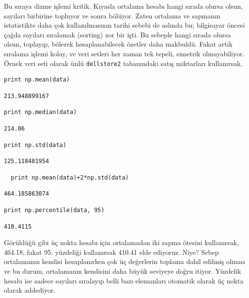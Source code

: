 \documentclass[12pt,fleqn]{article}\usepackage{../../common}
\begin{document}
Bu sıraya dizme işlemi kritik. Kıyasla ortalama hesabı hangi sırada olursa
olsun, sayıları birbirine topluyor ve sonra bölüyor. Zaten ortalama ve
sapmanın istatistikte daha çok kullanılmasının tarihi sebebi de aslında bu;
bilgisayar öncesi çağda sayıları sıralamak (sorting) zor bir işti. Bu
sebeple hangi sırada olursa olsun, toplayıp, bölerek hesaplanabilecek
özetler daha makbuldü. Fakat artık sıralama işlemi kolay, ve veri setleri
her zaman tek tepeli, simetrik olmayabiliyor. Örnek veri seti olarak ünlü
\verb!dellstore2! tabanındaki satış miktarları kullanırsak,

\begin{verbatim}
print np.mean(data)
\end{verbatim}

\begin{verbatim}
213.948899167
\end{verbatim}

\begin{verbatim}
print np.median(data)
\end{verbatim}

\begin{verbatim}
214.06
\end{verbatim}

\begin{verbatim}
print np.std(data)
\end{verbatim}

\begin{verbatim}
125.118481954
\end{verbatim}

\begin{verbatim}
  print np.mean(data)+2*np.std(data)
\end{verbatim}

\begin{verbatim}
464.185863074
\end{verbatim}

\begin{verbatim}
print np.percentile(data, 95)
\end{verbatim}

\begin{verbatim}
410.4115
\end{verbatim}

Görüldüğü gibi üç nokta hesabı için ortalamadan iki sapma ötesini
kullanırsak, 464.18, fakat 95. yüzdeliği kullanırsak 410.41 elde
ediyoruz. Niye? Sebep ortalamanın kendisi hesaplanırken çok üç
değerlerin toplama dahil edilmiş olması ve bu durum, ortalamanın
kendisini daha büyük seviyeye doğru itiyor. Yüzdelik hesabı ise sadece
sayıları sıralayıp belli bazı elemanları otomatik olarak üç nokta
olarak addediyor.
\end{document}
